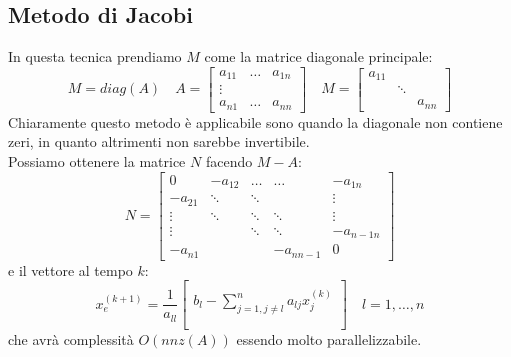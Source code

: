 \subsection{Metodo di Jacobi}
In questa tecnica prendiamo $M$ come la matrice diagonale principale:
\begin{equation*}
	M=diag(A) \quad A=\begin{bmatrix}
		a_{11} & \ldots & a_{1n} \\
		\vdots & & \\
		a_{n1} & \ldots & a_{nn}
	\end{bmatrix} \quad
	M = \begin{bmatrix}
		a_{11} \\
		& \ddots \\
		& & a_{nn}
	\end{bmatrix}
\end{equation*}
Chiaramente questo metodo è applicabile sono quando la diagonale non contiene zeri, in quanto altrimenti non sarebbe invertibile.\\
Possiamo ottenere la matrice $N$ facendo $M-A$:
\begin{equation*}
	N=\begin{bmatrix}
		0 & -a_{12} & \ldots & \ldots & -a_{1n} \\
		-a_{21} & \ddots & \ddots && \vdots \\
		\vdots & \ddots & \ddots & \ddots & \vdots \\
		\vdots & & \ddots & \ddots & -a_{n-1 n}\\
		-a_{n1} & & &-a_{n n-1} & 0 
	\end{bmatrix}
\end{equation*}
e il vettore al tempo $k$:
\begin{equation}
	x_e^{(k+1)} = \frac{1}{a_{ll}} \begin{bmatrix}\\
		b_l - \sum_{j=1, j\neq l}^n a_{lj}x_j^{(k)}\\
		\\
	\end{bmatrix} \quad l=1, \ldots, n
\end{equation}
che avrà complessità $O(nnz(A))$ essendo molto parallelizzabile.


